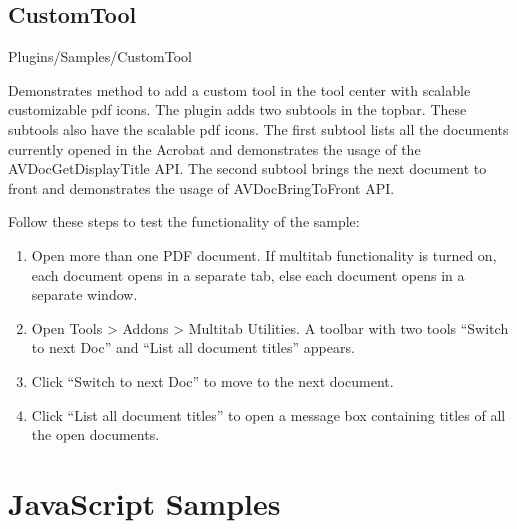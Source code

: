 \documentclass[letterpaper,12pt,english,openany,oneside]{sphinxmanual}
\begin{document}
\section{CustomTool}
\label{\detokenize{Samples_Plug_in:customtool}}\label{\detokenize{Samples_Plug_in:location-15}}

Plugins/Samples/CustomTool

\label{\detokenize{Samples_Plug_in:description-16}}

Demonstrates method to add a custom tool in the tool center with scalable customizable pdf icons. The plugin adds two sub\sphinxhyphen{}tools in the top\sphinxhyphen{}bar. These sub\sphinxhyphen{}tools also have the scalable pdf icons. The first sub\sphinxhyphen{}tool lists all the documents currently opened in the Acrobat and demonstrates the usage of the AVDocGetDisplayTitle API. The second sub\sphinxhyphen{}tool brings the next document to front and demonstrates the usage of AVDocBringToFront API.

\label{\detokenize{Samples_Plug_in:usage-13}}

Follow these steps to test the functionality of the sample:
\begin{enumerate}
%
\item {} 
Open more than one PDF document. If multi\sphinxhyphen{}tab functionality is turned on, each document opens in a separate tab, else each document opens in a separate window.

\item {} 
Open Tools > Add\sphinxhyphen{}ons > Multitab Utilities. A toolbar with two tools “Switch to next Doc” and “List all document titles” appears.

\item {} 
Click “Switch to next Doc” to move to the next document.

\item {} 
Click “List all document titles” to open a message box containing titles of all the open documents.

\end{enumerate}


\chapter{JavaScript Samples}
\label{\detokenize{Samples_JavaScript:javascript-samples}}\label{\detokenize{Samples_JavaScript::doc}}
\end{document}
